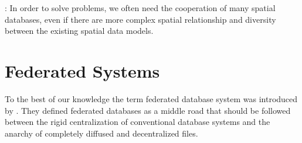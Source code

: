 \documentclass[12pt,a4paper]{report}
\begin{document}
	\citep{Gong}: In order to solve problems, we often need the cooperation of many spatial databases, even if there are more complex spatial relationship and diversity between the existing spatial data models.
	\\



	\section{Federated Systems}
	\label{sec:fed_geodata:fed}
	
	To the best of our knowledge the term federated database system was 
	introduced by \citet{Hammer}. They defined federated databases as a middle 
	road that should be followed between the rigid centralization of 
	conventional database systems and the anarchy of completely diffused and 
	decentralized files.
	\\
\end{document}
